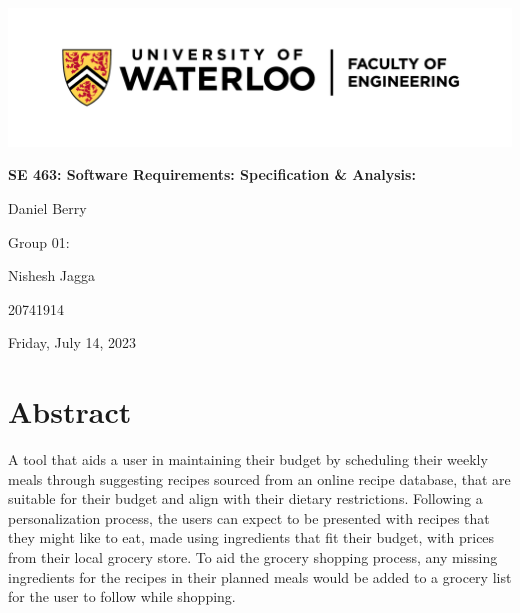 \documentclass[11pt, letterpaper]{report}
\begin{document}
\begin{titlepage}
    \centering
    \includegraphics[width=\textwidth]{images/logo.png}\par
    \vspace{1cm}
    {\bfseries SE 463: Software Requirements: Specification \& Analysis: \par}
    \vspace{0.5cm}
    {Daniel Berry \par}
    \vspace{5cm}
    {Group 01: \par}
    {Nishesh Jagga \par}
    {20741914 \par}
    \vspace{5cm}
    {Friday, July 14, 2023 \par}
\end{titlepage}
\restoregeometry

\tableofcontents
\thispagestyle{empty}
\clearpage

\pagestyle{fancy}
\fancyhf{}
\rfoot{\thepage}
\renewcommand{\headrulewidth}{0pt}

\chapter{Abstract}
\setcounter{page}{1}
A tool that aids a user in maintaining their budget by scheduling their weekly meals through suggesting recipes sourced from an online recipe database, that are suitable for their budget and align with their dietary restrictions. Following a personalization process, the users can expect to be presented with recipes that they might like to eat, made using ingredients that fit their budget, with prices from their local grocery store. To aid the grocery shopping process, any missing ingredients for the recipes in their planned meals would be added to a grocery list for the user to follow while shopping.

\end{document}

